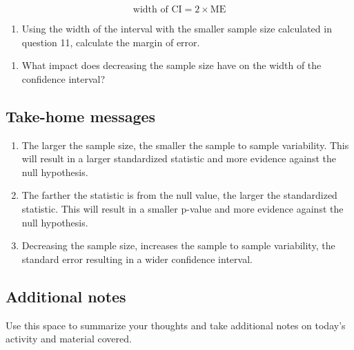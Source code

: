 \documentclass[
]{report}
\providecommand{\tightlist}{%
  \setlength{\itemsep}{0pt}\setlength{\parskip}{0pt}}
\begin{document}
\[\text{width of CI} = 2 \times \text{ME}\]

\begin{enumerate}
\def\labelenumi{\arabic{enumi}.}
\setcounter{enumi}{11}
\tightlist
\item
  Using the width of the interval with the smaller sample size calculated in question 11, calculate the margin of error.
\end{enumerate}

\vspace{0.4in}

\begin{enumerate}
\def\labelenumi{\arabic{enumi}.}
\setcounter{enumi}{12}
\tightlist
\item
  What impact does decreasing the sample size have on the width of the confidence interval?
\end{enumerate}

\vspace{0.4in}

\newpage

\subsection{Take-home messages}\label{take-home-messages-8}

\begin{enumerate}
\def\labelenumi{\arabic{enumi}.}
\item
  The larger the sample size, the smaller the sample to sample variability. This will result in a larger standardized statistic and more evidence against the null hypothesis.
\item
  The farther the statistic is from the null value, the larger the standardized statistic. This will result in a smaller p-value and more evidence against the null hypothesis.
\item
  Decreasing the sample size, increases the sample to sample variability, the standard error resulting in a wider confidence interval.
\end{enumerate}

\subsection{Additional notes}\label{additional-notes-8}

Use this space to summarize your thoughts and take additional notes on today's activity and material covered.

\newpage
\end{document}

